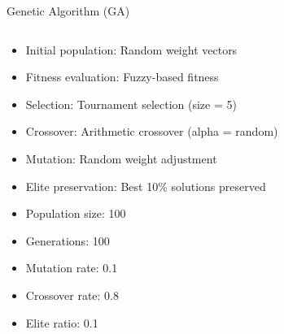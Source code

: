 \documentclass[aspectratio=169,xcolor=table]{beamer}
\begin{document}
\begin{frame}{Genetic Algorithm (GA)}
  \begin{columns}
    \begin{column}{0.55\textwidth}
      \begin{tcolorbox}[
        enhanced,
        colback=blue!5,
        colframe=blue!70,
        arc=2mm,
        title=GA Components,
        fonttitle=\bfseries\large,
        boxrule=0.5mm
      ]
        \begin{itemize}
          \item Initial population: Random weight vectors
          \item Fitness evaluation: Fuzzy-based fitness
          \item Selection: Tournament selection (size = 5)
          \item Crossover: Arithmetic crossover (alpha = random)
          \item Mutation: Random weight adjustment
          \item Elite preservation: Best 10\% solutions preserved
        \end{itemize}
      \end{tcolorbox}
      
      \vspace{0.3cm}
      
      \begin{tcolorbox}[
        enhanced,
        colback=green!5,
        colframe=green!70,
        arc=2mm,
        title=Implementation Parameters,
        fonttitle=\bfseries\large,
        boxrule=0.5mm
      ]
        \begin{itemize}
          \item Population size: 100
          \item Generations: 100
          \item Mutation rate: 0.1
          \item Crossover rate: 0.8
          \item Elite ratio: 0.1
        \end{itemize}
      \end{tcolorbox}
    \end{column}
    \begin{column}{0.45\textwidth}
    \end{column}
  \end{columns}
\end{frame}
\end{document}
